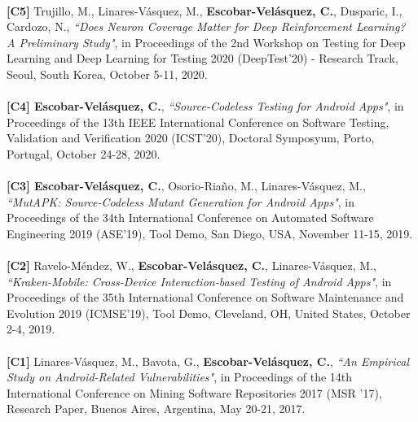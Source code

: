 \documentclass[letterpaper,11pt,oneside]{article}
\begin{document}
\\
\noindent \textbf{[C5]} Trujillo, M., Linares-V\'asquez,  M., \textbf{Escobar-Velásquez, C.}, Dusparic, I., Cardozo, N., \textit{``Does Neuron Coverage Matter for Deep Reinforcement Learning? A Preliminary Study"}, in Proceedings of the 2nd Workshop on Testing for Deep Learning and Deep Learning for Testing 2020 (DeepTest’20) - Research Track, Seoul, South Korea, October 5-11, 2020. \\\\
\noindent \textbf{[C4] Escobar-Velásquez, C.}, \textit{``Source-Codeless Testing for Android Apps"}, in Proceedings of the 13th IEEE International Conference on Software Testing, Validation and Verification 2020 (ICST’20), Doctoral Symposyum, Porto, Portugal, October 24-28, 2020. \\\\
\noindent \textbf{[C3] Escobar-Velásquez, C.}, Osorio-Riaño, M., Linares-Vásquez, M., \textit{``MutAPK: Source-Codeless Mutant Generation for Android Apps"}, in Proceedings of the 34th International Conference on Automated Software Engineering 2019 (ASE’19), Tool Demo, San Diego, USA, November 11-15, 2019. \\\\
\noindent \textbf{[C2]} Ravelo-Méndez, W., \textbf{Escobar-Velásquez, C.}, Linares-Vásquez, M., \textit{``Kraken-Mobile: Cross-Device Interaction-based Testing of Android Apps"}, in Proceedings of the 35th International Conference on Software Maintenance and Evolution 2019 (ICMSE’19), Tool Demo, Cleveland, OH, United States, October 2-4, 2019. \\\\
\noindent \textbf{[C1]} Linares-Vásquez, M., Bavota, G., \textbf{Escobar-Velásquez, C.}, \textit{``An Empirical Study on Android-Related Vulnerabilities"}, in Proceedings of the 14th International Conference on Mining Software Repositories 2017 (MSR ’17), Research Paper, Buenos Aires, Argentina, May 20-21, 2017. \\
\end{document}

